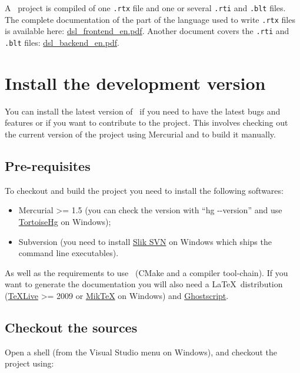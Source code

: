 \documentclass[american]{rtxarticle}
\begin{document}
A \rtx\ project is compiled of one \texttt{.rtx} file and one or several
\texttt{.rti} and \texttt{.blt} files. The complete documentation of the part of
the language used to write \texttt{.rtx} files is available here:
\href{http://rathaxes.googlecode.com/files/dsl_frontend_en.pdf}{dsl\_frontend\_en.pdf}.
Another document covers the \texttt{.rti} and \texttt{.blt} files:
\href{http://rathaxes.googlecode.com/files/dsl_backend_en.pdf}{dsl\_backend\_en.pdf}.

\section{Install the development version}

You can install the latest version of \rtx\ if you need to have the latest bugs
and features or if you want to contribute to the project. This involves checking
out the current version of the project using Mercurial and to build it manually.

\subsection{Pre-requisites}

To checkout and build the project you need to install the following softwares:
\begin{itemize}
\item Mercurial >= 1.5 (you can check the version with ``hg {-}{-}version'' and
      use \href{http://tortoisehg.bitbucket.org/download/index.html}{TortoiseHg}
      on Windows);
\item Subversion (you need to install \href{http://www.sliksvn.com/en/download}{Slik
      SVN} on Windows which ships the command line executables).
\end{itemize}

As well as the requirements to use \rtx\ (CMake and a compiler tool-chain). If
you want to generate the documentation you will also need a \LaTeX\ distribution
(\href{http://www.tug.org/texlive/}{\TeX Live} >= 2009 or \href{http://www.miktex.org/}{Mik\TeX}
on Windows) and \href{http://pages.cs.wisc.edu/~ghost/}{Ghostscript}.

\subsection{Checkout the sources}

Open a shell (from the Visual Studio menu on Windows), and checkout the project
using:
\end{document}

